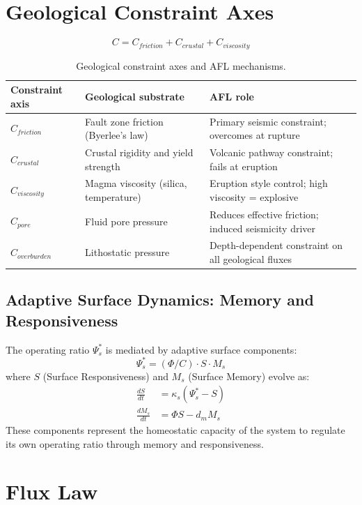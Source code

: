 \documentclass[11pt]{article}
\begin{document}
\section{Geological Constraint Axes}

\begin{equation}
C = C_{friction} + C_{crustal} + C_{viscosity}
\end{equation}

\begin{table}[h]
\centering
\caption{Geological constraint axes and AFL mechanisms.}
\begin{tabularx}{\textwidth}{@{}lXX@{}}
\toprule
Constraint axis & Geological substrate & AFL role \\
\midrule
$C_{friction}$ & Fault zone friction (Byerlee's law) & Primary seismic constraint; overcomes at rupture \\
$C_{crustal}$ & Crustal rigidity and yield strength & Volcanic pathway constraint; fails at eruption \\
$C_{viscosity}$ & Magma viscosity (silica, temperature) & Eruption style control; high viscosity = explosive \\
$C_{pore}$ & Fluid pore pressure & Reduces effective friction; induced seismicity driver \\
$C_{overburden}$ & Lithostatic pressure & Depth-dependent constraint on all geological fluxes \\
\bottomrule
\end{tabularx}
\end{table}

\subsection{Adaptive Surface Dynamics: Memory and Responsiveness}

The operating ratio $\Psi_s^*$ is mediated by adaptive surface components:
\begin{equation}
\Psi_s^* = (\Phi/C) \cdot S \cdot M_s
\end{equation}
where $S$ (Surface Responsiveness) and $M_s$ (Surface Memory) evolve as:
\begin{align}
\frac{dS}{dt} &= \kappa_s (\Psi_s^* - S) \\
\frac{dM_s}{dt} &= \Phi S - d_m M_s
\end{align}
These components represent the homeostatic capacity of the system to regulate its own operating ratio through memory and responsiveness.

\section{Flux Law}
\end{document}
